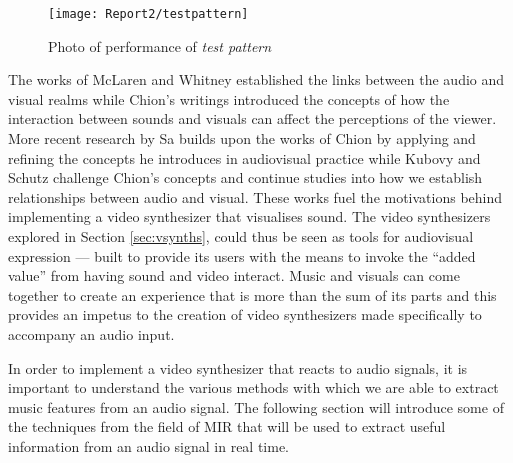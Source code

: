 \documentclass[../initial_thesis.tex]{subfiles}
\begin{document}
\begin{figure}
  \texttt{[image: Report2/testpattern]}
  \centering
  \caption{Photo of performance of \textit{test pattern} \cite{Ikeda}}
  \label{fig:testpattern}
\end{figure}

The works of McLaren and Whitney established the links between the audio and visual realms while Chion's writings introduced the concepts of how the interaction between sounds and visuals can affect the perceptions of the viewer. More recent research by Sa builds upon the works of Chion by applying and refining the concepts he introduces in audiovisual practice while Kubovy and Schutz challenge Chion's concepts and continue studies into how we establish relationships between audio and visual. These works fuel the motivations behind implementing a video synthesizer that visualises sound. The video synthesizers explored in Section \ref{sec:vsynths}, could thus be seen as tools for audiovisual expression --- built to provide its users with the means to invoke the ``added value'' from having sound and video interact. Music and visuals can come together to create an experience that is more than the sum of its parts and this provides an impetus to the creation of video synthesizers made specifically to accompany an audio input. \par

In order to implement a video synthesizer that reacts to audio signals, it is important to understand the various methods with which we are able to extract music features from an audio signal. The following section will introduce some of the techniques from the field of MIR that will be used to extract useful information from an audio signal in real time.
\end{document}
